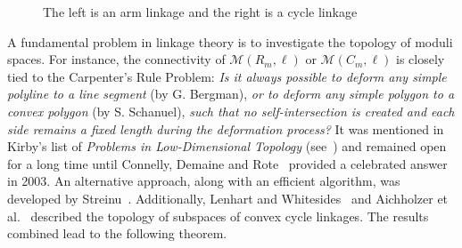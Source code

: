 \documentclass[11pt,letterpaper]{amsart}
\theoremstyle{plain}
\theoremstyle{definition}
\theoremstyle{remark}
\numberwithin{equation}{section}
\begin{document}
\begin{figure}[htbp]
     \centering
     \begin{minipage}[b]{0.40\textwidth}
     \centering
{}
     \end{minipage}
     \hfill
     \begin{minipage}[b]{0.50\textwidth}
     \centering
{}
     \end{minipage}
     \hfill
\caption{The left is an arm linkage and the right is a cycle linkage}\label{F-1}
\end{figure}

A fundamental problem in linkage theory is to investigate the topology of moduli spaces. For instance, the connectivity of $\mathcal M(R_m,\ell)$ or $\mathcal M(C_m,\ell)$ is closely tied to the Carpenter's Rule Problem: \emph{Is it always possible to deform any simple polyline to a line segment} (by G. Bergman), \emph{or to deform any simple polygon to a convex polygon} (by S. Schanuel), \emph{such that no self-intersection is created and each side remains a fixed length during the deformation process?} It was mentioned in Kirby's list of \textsl{Problems in Low-Dimensional Topology} (see~\cite[Problem 5.18]{Kirby-1997}) and remained open for a long time until Connelly, Demaine and Rote~\cite{Connelly-2003} provided a celebrated answer in 2003. An alternative approach, along with an efficient algorithm, was developed by Streinu~\cite{Streinu-2005}. Additionally, Lenhart and Whitesides~\cite{Lenhart-1995} and Aichholzer et al.~\cite{Aichholzer-2001} described the topology of subspaces of convex cycle linkages. The results combined lead to the following theorem.
\end{document}
